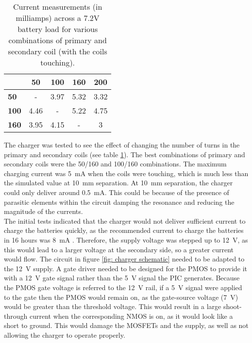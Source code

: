 \begin{table}[htb]
	\begin{center}
	\caption{Current measurements (in milliamps) across a 7.2V battery load for various combinations of primary and secondary coil (with the coils touching).}
	\label{tab: coil combinations}
	\begin{tabular}{|l|*{4}{c|}}
		\hline
		\backslashbox{\textbf{Primary Turns}}{\textbf{Secondary Turns}} & \textbf{50} & \textbf{100} & \textbf{160} & \textbf{200} \\
		\hline
		\textbf{50} & - & 3.97 & 5.32 & 3.32 \\
		\hline
		\textbf{100} & 4.46 & - & 5.22 & 4.75 \\
		\hline
		\textbf{160} & 3.95 & 4.15 & - & 3\\
		\hline
	\end{tabular}
	\end{center}
\end{table}

The charger was tested to see the effect of changing the number of turns in the primary and secondary coils (see table \ref{tab: coil combinations}). The best combinations of primary and secondary coils were the 50/160 and 100/160 combinations. The maximum charging current was \SI{5}{\milli\ampere} when the coils were touching, which is much less than the simulated value at \SI{10}{\milli\metre} separation. At \SI{10}{\milli\metre} separation, the charger could only deliver around \SI{0.5}{\milli\ampere}. This could be because of the presence of parasitic elements within the circuit damping the resonance and reducing the magnitude of the currents. \\ 



The initial tests indicated that the charger would not deliver sufficient current to charge the batteries quickly, as the recommended current to charge the batteries in 16 hours was \SI{8}{\milli\ampere} \cite{rs_pro_batteries}. Therefore, the supply voltage was stepped up to \SI{12}{\volt}, as this would lead to a larger voltage at the secondary side, so a greater current would flow. The circuit in figure \ref{fig: charger schematic} needed to be adapted to the \SI{12}{\volt} supply. A gate driver needed to be designed for the PMOS to provide it with a \SI{12}{\volt} gate signal rather than the \SI{5}{\volt} signal the PIC generates. Because the PMOS gate voltage is referred to the \SI{12}{\volt} rail, if a \SI{5}{\volt} signal were applied to the gate then the PMOS would remain on, as the gate-source voltage (\SI{7}{\volt}) would be greater than the threshold voltage. This would result in a large shoot-through current when the corresponding NMOS is on, as it would look like a short to ground. This would damage the MOSFETs and the supply, as well as not allowing the charger to operate properly. \\

